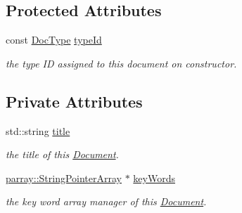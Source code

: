 \subsection*{Protected Attributes}
\begin{DoxyCompactItemize}
\item 
\hypertarget{classdocs_1_1Document_ad5250ef4bd98928dfbe6243162536389}{const \hyperlink{classdocs_1_1DocType}{Doc\-Type} \hyperlink{classdocs_1_1Document_ad5250ef4bd98928dfbe6243162536389}{type\-Id}}\label{classdocs_1_1Document_ad5250ef4bd98928dfbe6243162536389}

\begin{DoxyCompactList}\small\item\em the type I\-D assigned to this document on constructor. \end{DoxyCompactList}\end{DoxyCompactItemize}
\subsection*{Private Attributes}
\begin{DoxyCompactItemize}
\item 
\hypertarget{classdocs_1_1Document_a419e4470c20e1bddd60448ba430f4738}{std\-::string \hyperlink{classdocs_1_1Document_a419e4470c20e1bddd60448ba430f4738}{title}}\label{classdocs_1_1Document_a419e4470c20e1bddd60448ba430f4738}

\begin{DoxyCompactList}\small\item\em the title of this \hyperlink{classdocs_1_1Document}{Document}. \end{DoxyCompactList}\item 
\hypertarget{classdocs_1_1Document_a7539ac1430ded1f3a15f2532de8f0381}{\hyperlink{classparray_1_1StringPointerArray}{parray\-::\-String\-Pointer\-Array} $\ast$ \hyperlink{classdocs_1_1Document_a7539ac1430ded1f3a15f2532de8f0381}{key\-Words}}\label{classdocs_1_1Document_a7539ac1430ded1f3a15f2532de8f0381}

\begin{DoxyCompactList}\small\item\em the key word array manager of this \hyperlink{classdocs_1_1Document}{Document}. \end{DoxyCompactList}\end{DoxyCompactItemize}
